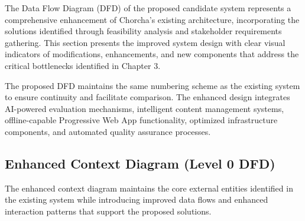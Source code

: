 \documentclass[12pt,a4paper,oneside]{book}
\begin{document}
The Data Flow Diagram (DFD) of the proposed candidate system represents a comprehensive enhancement of Chorcha's existing architecture, incorporating the solutions identified through feasibility analysis and stakeholder requirements gathering. This section presents the improved system design with clear visual indicators of modifications, enhancements, and new components that address the critical bottlenecks identified in Chapter 3.

The proposed DFD maintains the same numbering scheme as the existing system to ensure continuity and facilitate comparison. The enhanced design integrates AI-powered evaluation mechanisms, intelligent content management systems, offline-capable Progressive Web App functionality, optimized infrastructure components, and automated quality assurance processes.

\subsection{Enhanced Context Diagram (Level 0 DFD)}

The enhanced context diagram maintains the core external entities identified in the existing system while introducing improved data flows and enhanced interaction patterns that support the proposed solutions.
\end{document}
